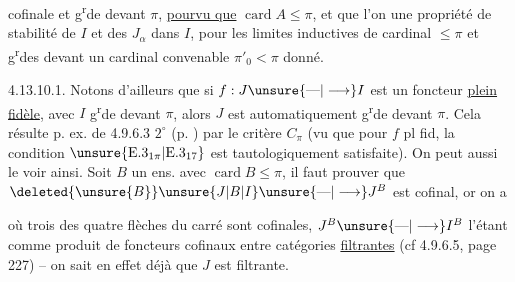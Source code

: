 
cofinale et g\textsuperscript{r}de devant $\pi$, \uline{pourvu que}
$\operatorname{card} A\leq\pi$, et que l'on  une
propriété de stabilité de $I$ et des
$J_\alpha$ dans $I$, pour les limites inductives
de cardinal $\leq\pi$ et g\textsuperscript{r}des devant un
cardinal convenable $\pi'_0<\pi$ donné.

4.13.10.1. Notons d'ailleurs que si
$f:J\unsure{\text{---}|\longrightarrow}I$ est un foncteur  \uline{plein} \uline{fidèle},
avec $I$ g\textsuperscript{r}de devant $\pi$, alors $J$ est
automatiquement g\textsuperscript{r}de devant $\pi$. Cela
résulte p. ex. de 4.9.6.3 $2^\circ$ (p. )
par le critère $C_\pi$ (vu que pour $f$ pl fid,
la condition $\unsure{\mathrm E.3_{1\pi}|\mathrm E.3_{17}}$ est tautologiquement
satisfaite). On peut aussi le voir ainsi.
Soit $B$ un ens. avec $\operatorname{card}B\leq\pi$,
il faut prouver que $\deleted{\unsure{B}}\unsure{J|B|I}\unsure{\text{---}|\longrightarrow}J^B$ est cofinal,
or on a


où trois des quatre flèches du carré
sont cofinales, $J^B\unsure{\text{---}|\longrightarrow}I^B$ l'étant comme
produit de foncteurs cofinaux entre
catégories \uline{filtrantes} (cf 4.9.6.5, page 227)
-- on sait en effet déjà que $J$ est filtrante.

